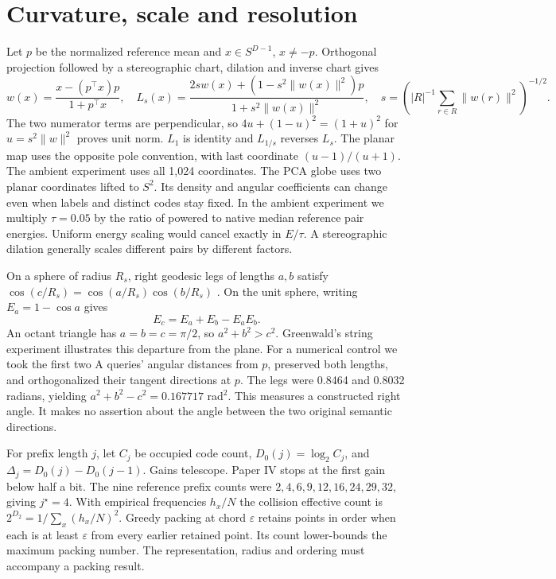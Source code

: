 \documentclass[11pt,a4paper]{article}
\begin{document}
\section{Curvature, scale and resolution}
Let $p$ be the normalized reference mean and $x\in S^{D-1}$, $x\ne-p$. Orthogonal projection followed by a stereographic chart, dilation and inverse chart gives
\begin{equation}
 w(x)=\frac{x-(p^\top x)p}{1+p^\top x},\quad
 L_s(x)=\frac{2sw(x)+(1-s^2\|w(x)\|^2)p}{1+s^2\|w(x)\|^2},\quad
 s=\left(|R|^{-1}\sum_{r\in R}\|w(r)\|^2\right)^{-1/2}.\label{eq:lens}
\end{equation}
The two numerator terms are perpendicular, so $4u+(1-u)^2=(1+u)^2$ for $u=s^2\|w\|^2$ proves unit norm. $L_1$ is identity and $L_{1/s}$ reverses $L_s$. The planar map uses the opposite pole convention, with last coordinate $(u-1)/(u+1)$. The ambient experiment uses all 1,024 coordinates. The PCA globe uses two planar coordinates lifted to $S^2$. Its density and angular coefficients can change even when labels and distinct codes stay fixed. In the ambient experiment we multiply $\tau=0.05$ by the ratio of powered to native median reference pair energies. Uniform energy scaling would cancel exactly in $E/\tau$. A stereographic dilation generally scales different pairs by different factors.

On a sphere of radius $R_s$, right geodesic legs of lengths $a,b$ satisfy $\cos(c/R_s)=\cos(a/R_s)\cos(b/R_s)$ \citep{green,sphere}. On the unit sphere, writing $E_a=1-\cos a$ gives
\begin{equation}
 E_c=E_a+E_b-E_aE_b. \label{eq:curve}
\end{equation}
An octant triangle has $a=b=c=\pi/2$, so $a^2+b^2>c^2$. Greenwald's string experiment illustrates this departure from the plane. For a numerical control we took the first two A queries' angular distances from $p$, preserved both lengths, and orthogonalized their tangent directions at $p$. The legs were 0.8464 and 0.8032 radians, yielding $a^2+b^2-c^2=0.167717$ rad$^2$. This measures a constructed right angle. It makes no assertion about the angle between the two original semantic directions.

For prefix length $j$, let $C_j$ be occupied code count, $D_0(j)=\log_2 C_j$, and $\Delta_j=D_0(j)-D_0(j-1)$. Gains telescope. Paper IV stops at the first gain below half a bit. The nine reference prefix counts were $2,4,6,9,12,16,24,29,32$, giving $j^\star=4$. With empirical frequencies $h_x/N$ the collision effective count is $2^{D_2}=1/\sum_x(h_x/N)^2$. Greedy packing at chord $\varepsilon$ retains points in order when each is at least $\varepsilon$ from every earlier retained point. Its count lower-bounds the maximum packing number. The representation, radius and ordering must accompany a packing result.
\end{document}
